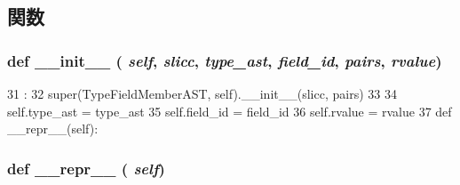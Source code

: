 \subsection{関数}
\hypertarget{classslicc_1_1ast_1_1TypeFieldMemberAST_1_1TypeFieldMemberAST_ac775ee34451fdfa742b318538164070e}{
\subsubsection[{\_\-\_\-init\_\-\_\-}]{\setlength{\rightskip}{0pt plus 5cm}def \_\-\_\-init\_\-\_\- ( {\em self}, \/   {\em slicc}, \/   {\em type\_\-ast}, \/   {\em field\_\-id}, \/   {\em pairs}, \/   {\em rvalue})}}
\label{classslicc_1_1ast_1_1TypeFieldMemberAST_1_1TypeFieldMemberAST_ac775ee34451fdfa742b318538164070e}



\begin{DoxyCode}
31                                                                 :
32         super(TypeFieldMemberAST, self).__init__(slicc, pairs)
33 
34         self.type_ast = type_ast
35         self.field_id = field_id
36         self.rvalue = rvalue
37 
    def __repr__(self):
\end{DoxyCode}
\hypertarget{classslicc_1_1ast_1_1TypeFieldMemberAST_1_1TypeFieldMemberAST_ad8b9328939df072e4740cd9a63189744}{
\subsubsection[{\_\-\_\-repr\_\-\_\-}]{\setlength{\rightskip}{0pt plus 5cm}def \_\-\_\-repr\_\-\_\- ( {\em self})}}
\label{classslicc_1_1ast_1_1TypeFieldMemberAST_1_1TypeFieldMemberAST_ad8b9328939df072e4740cd9a63189744}



